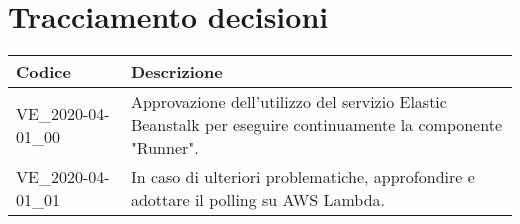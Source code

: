 \section{Tracciamento decisioni}
\renewcommand{\arraystretch}{1.8}

\begin{longtable}{|p{5cm}|p{8cm}|}
	\hline
	
	\rowcolor{header}
	\textbf{Codice} & \textbf{Descrizione} \\
	
	\hline
	
	VE\_2020-04-01\_00 & Approvazione dell'utilizzo del servizio Elastic Beanstalk per eseguire continuamente la componente "Runner".\\
	VE\_2020-04-01\_01 & In caso di ulteriori problematiche, approfondire e adottare il polling su AWS Lambda. \\
	\hline
\end{longtable}
